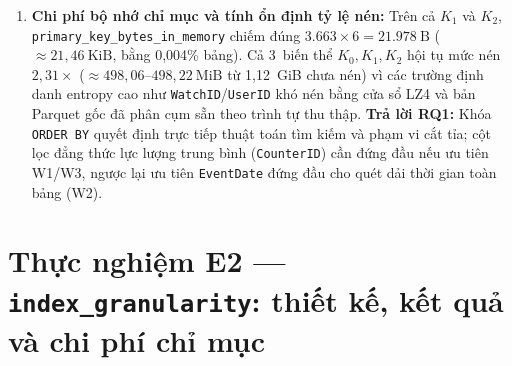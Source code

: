 \documentclass[13pt,a4paper]{report}
\begin{document}
\begin{enumerate}
    \item \textbf{Chi phí bộ nhớ chỉ mục và tính ổn định tỷ lệ nén:} Trên cả $K_1$ và $K_2$, \texttt{primary\_\allowbreak{}key\_\allowbreak{}bytes\_\allowbreak{}in\_\allowbreak{}memory} chiếm đúng $3.663 \times 6 = 21.978~\text{B}$ ($\approx 21{,}46~\text{KiB}$, bằng 0,004\% bảng). Cả 3~biến thể $K_0, K_1, K_2$ hội tụ mức nén $2{,}31{\times}$ ($\approx 498{,}06\text{--}498{,}22~\text{MiB}$ từ 1,12~GiB chưa nén) vì các trường định danh entropy cao như \texttt{WatchID}/\texttt{UserID} khó nén bằng cửa sổ LZ4 và bản Parquet gốc đã phân cụm sẵn theo trình tự thu thập. \textbf{Trả lời RQ1:} Khóa \texttt{ORDER BY} quyết định trực tiếp thuật toán tìm kiếm và phạm vi cắt tỉa; cột lọc đẳng thức lực lượng trung bình (\texttt{CounterID}) cần đứng đầu nếu ưu tiên W1/W3, ngược lại ưu tiên \texttt{EventDate} đứng đầu cho quét dải thời gian toàn bảng (W2).
\end{enumerate}

\section{Thực nghiệm E2 --- \texorpdfstring{\texttt{index\_granularity}}{index\_granularity}: thiết kế, kết quả và chi phí chỉ mục}
\end{document}
